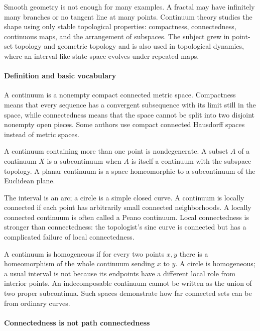 Smooth geometry is not enough for many examples. A fractal may have infinitely many branches or no tangent line at many points. Continuum theory studies the shape using only stable topological properties: compactness, connectedness, continuous maps, and the arrangement of subspaces. The subject grew in point-set topology and geometric topology and is also used in topological dynamics, where an interval-like state space evolves under repeated maps. \cite{continuum_theory_ref1,continuum_theory_ref2}

\paragraph{Definition and basic vocabulary}

A continuum is a nonempty compact connected metric space. Compactness means that every sequence has a convergent subsequence with its limit still in the space, while connectedness means that the space cannot be split into two disjoint nonempty open pieces. Some authors use compact connected Hausdorff spaces instead of metric spaces.

A continuum containing more than one point is nondegenerate. A subset $A$ of a continuum $X$ is a subcontinuum when $A$ is itself a continuum with the subspace topology. A planar continuum is a space homeomorphic to a subcontinuum of the Euclidean plane.

The interval is an arc; a circle is a simple closed curve. A continuum is locally connected if each point has arbitrarily small connected neighborhoods. A locally connected continuum is often called a Peano continuum. Local connectedness is stronger than connectedness: the topologist's sine curve is connected but has a complicated failure of local connectedness.

A continuum is homogeneous if for every two points $x,y$ there is a homeomorphism of the whole continuum sending $x$ to $y$. A circle is homogeneous; a usual interval is not because its endpoints have a different local role from interior points. An indecomposable continuum cannot be written as the union of two proper subcontinua. Such spaces demonstrate how far connected sets can be from ordinary curves. \cite{continuum_theory_ref1,continuum_theory_ref3}

\paragraph{Connectedness is not path connectedness}

